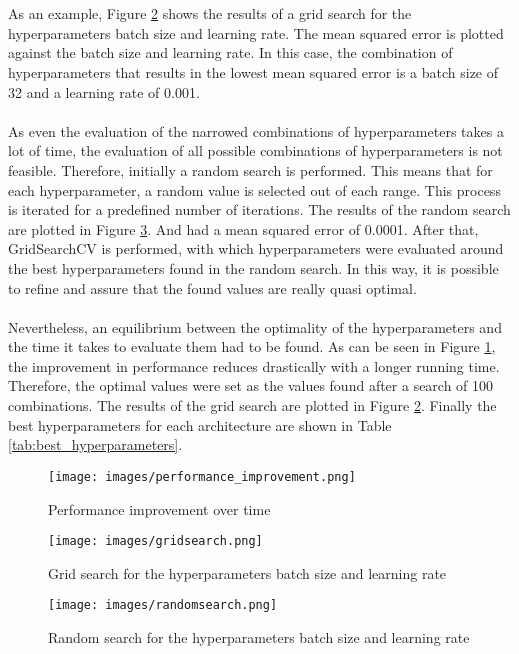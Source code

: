\begin{table}[H]
\\ \\
As an example, Figure \ref{fig:gridsearch} shows the results of a grid search for the hyperparameters batch size and learning rate. The mean squared error is plotted against the batch size and learning rate. In this case, the combination of hyperparameters that results in the lowest mean squared error is a batch size of 32 and a learning rate of 0.001.
\\ \\
As even the evaluation of the narrowed combinations of hyperparameters takes a lot of time, the evaluation of all possible combinations of hyperparameters is not feasible. Therefore, initially a random search is performed. This means that for each hyperparameter, a random value is selected out of each range. This process is iterated for a predefined number of iterations. The results of the random search are plotted in Figure \ref{fig:randomsearch}. And had a mean squared error of 0.0001. After that, GridSearchCV is performed, with which hyperparameters were evaluated around the best hyperparameters found in the random search. In this way, it is possible to refine and assure that the found values are really quasi optimal. 
\\ \\
Nevertheless, an equilibrium between the optimality of the hyperparameters and the time it takes to evaluate them had to be found. As can be seen in Figure \ref{fig:performance_improvement}, the improvement in performance reduces drastically with a longer running time. Therefore, the optimal values were set as the values found after a search of 100 combinations. The results of the grid search are plotted in Figure \ref{fig:gridsearch}. Finally the best hyperparameters for each architecture are shown in Table \ref{tab:best_hyperparameters}.

\begin{figure} [H]
    \centering
    \texttt{[image: images/performance\_improvement.png]}
    \caption{Performance improvement over time}
    \label{fig:performance_improvement}
\end{figure}

\begin{figure}[H]
\centering
\texttt{[image: images/gridsearch.png]}
\caption{Grid search for the hyperparameters batch size and learning rate}
\label{fig:gridsearch}
\end{figure}

\begin{figure}[H]
\centering
\texttt{[image: images/randomsearch.png]}
\caption{Random search for the hyperparameters batch size and learning rate}
\label{fig:randomsearch}
\end{figure}


\end{table}
